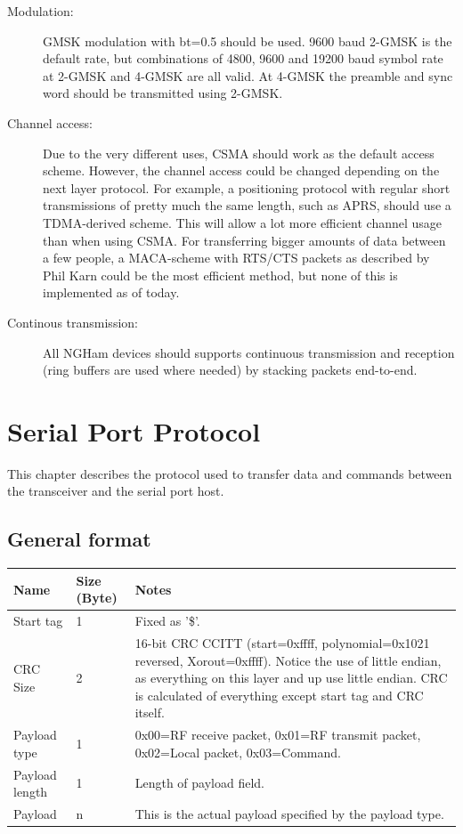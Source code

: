 \documentclass[a4paper, english, 12pt, hidelinks]{article}
\begin{document}
\begin{description}
        \item[Modulation:] GMSK modulation with bt=0.5 should be used. 9600 baud 2-GMSK is the default rate,
        but combinations of 4800, 9600 and 19200 baud symbol rate at 2-GMSK and 4-GMSK are all valid. At
        4-GMSK the preamble and sync word should be transmitted using 2-GMSK.

        \item[Channel access:] Due to the very different uses, CSMA should work as the default access scheme.
        However, the channel access could be changed depending on the next layer protocol. For example, a
        positioning protocol with regular short transmissions of pretty much the same length, such as APRS,
        should use a TDMA-derived scheme. This will allow a lot more efficient channel usage than when using CSMA.
        For transferring bigger amounts of data between a few people, a MACA-scheme with RTS/CTS
        packets as described by Phil Karn could be the most efficient method, but none of this is
        implemented as of today.

        \item[Continous transmission:] All NGHam devices should supports continuous transmission and reception
        (ring buffers are used where needed) by stacking packets end-to-end.
    \end{description}
	\clearpage

\section{Serial Port Protocol}
    This chapter describes the protocol used to transfer data and commands between the transceiver
    and the serial port host.

    \subsection{General format}
		\begin{table}[H]
			\centering
			\begin{tabular}{|p{3cm}|p{2cm}|p{10cm}|}
				\hline
				Name & Size (Byte) & Notes \\
				\hline
                Start tag & 1 & Fixed as '\$'. \\
                CRC Size & 2 & 16-bit CRC CCITT (start=0xffff, polynomial=0x1021 reversed, Xorout=0xffff). 
                Notice the use of little endian, as everything on this layer and up use little endian.
                CRC is calculated of everything except start tag and CRC itself.\\
                Payload type & 1 & 0x00=RF receive packet, 0x01=RF transmit packet, 0x02=Local packet, 0x03=Command. \\
                Payload length & 1 & Length of payload field. \\
                Payload & n & This is the actual payload specified by the payload type. \\
				\hline
			\end{tabular}
		\end{table}
\end{document}
